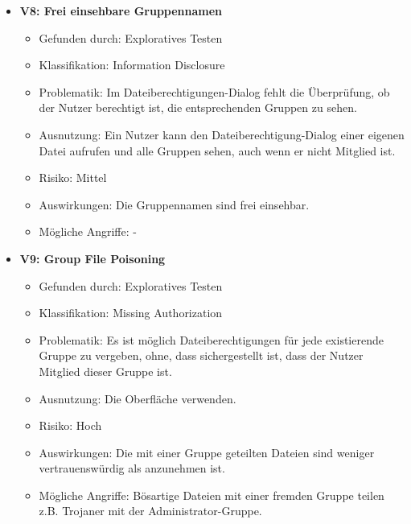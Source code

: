 \documentclass[12pt,DIV14,BCOR10mm,a4paper,parskip=half-,headsepline,headinclude,english,ngerman,bibliography=totocnumbered]{scrreprt}
\begin{document}
\begin{itemize}
  \hypertarget{vulnerability8}{}
  \item \textbf{V8: Frei einsehbare Gruppennamen}
  \begin{itemize}
  \item Gefunden durch: Exploratives Testen
  \item Klassifikation: Information Disclosure
  \item Problematik: Im Dateiberechtigungen-Dialog fehlt die Überprüfung, ob der Nutzer berechtigt ist, die entsprechenden Gruppen zu sehen.
  \item Ausnutzung: Ein Nutzer kann den Dateiberechtigung-Dialog einer eigenen Datei aufrufen und alle Gruppen sehen, auch wenn er nicht Mitglied ist.
  \item Risiko: Mittel
  \item Auswirkungen: Die Gruppennamen sind frei einsehbar.
  \item Mögliche Angriffe: -
  \end{itemize}

    \hypertarget{vulnerability9}{}
  \item \textbf{V9: Group File Poisoning}
  \begin{itemize}
  \item Gefunden durch: Exploratives Testen
  \item Klassifikation: Missing Authorization
  \item Problematik: Es ist möglich Dateiberechtigungen für jede existierende Gruppe zu vergeben, ohne, dass sichergestellt ist, dass der Nutzer Mitglied dieser Gruppe ist.
  \item Ausnutzung: Die Oberfläche verwenden.
  \item Risiko: Hoch
  \item Auswirkungen: Die mit einer Gruppe geteilten Dateien sind weniger vertrauenswürdig als anzunehmen ist.
  \item Mögliche Angriffe: Bösartige Dateien mit einer fremden Gruppe teilen z.B. Trojaner mit der Administrator-Gruppe.
  \end{itemize}


\end{itemize}
\end{document}
